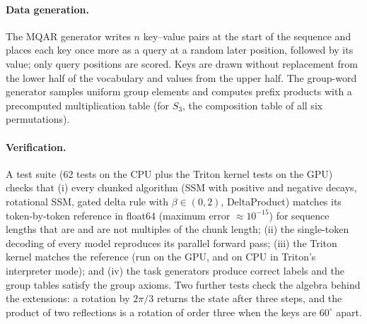 \paragraph{Data generation.} The MQAR generator writes $n$ key--value pairs at the start of the sequence and
places each key once more as a query at a random later position, followed by its value; only query positions
are scored. Keys are drawn without replacement from the lower half of the vocabulary and values from the
upper half. The group-word generator samples uniform group elements and computes prefix products with a
precomputed multiplication table (for $S_3$, the composition table of all six permutations).

\paragraph{Verification.} A test suite (62 tests on the CPU plus the Triton kernel tests on the GPU) checks that (i) every chunked algorithm (SSM with positive
and negative decays, rotational SSM, gated delta rule with $\beta\in(0,2)$, DeltaProduct) matches its
token-by-token reference in float64 (maximum error $\approx10^{-15}$) for sequence lengths that are and are not
multiples of the chunk length; (ii) the single-token decoding of every model reproduces its parallel forward
pass; (iii) the Triton kernel matches the reference (run on the GPU, and on CPU in Triton's interpreter mode);
and (iv) the task generators produce correct labels and the group tables satisfy the group axioms. Two
further tests check the algebra behind the extensions: a rotation by $2\pi/3$ returns the state after three
steps, and the product of two reflections is a rotation of order three when the keys are $60^\circ$ apart.
